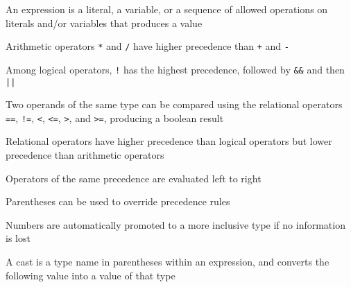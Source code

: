 \documentclass[8pt,a4paper,compress]{beamer}
\begin{document}
\begin{frame}[fragile]
\pause

An expression is a literal, a variable, or a sequence of allowed operations on literals and/or variables that produces a value

\pause
\bigskip

Arithmetic operators \lstinline{*} and \lstinline{/} have higher precedence than \lstinline{+} and \lstinline{-}

\pause
\bigskip

Among logical operators, \lstinline{!} has the highest precedence, followed by \lstinline{&&} and then \lstinline{||}

\pause
\bigskip

Two operands of the same type can be compared using the relational operators \lstinline{==}, \lstinline{!=}, \lstinline{<}, \lstinline{<=}, \lstinline{>}, and \lstinline{>=}, producing a boolean result

\pause
\bigskip

Relational operators have higher precedence than logical operators but lower precedence than arithmetic operators

\pause
\bigskip

Operators of the same precedence are evaluated left to right

\pause
\bigskip

Parentheses can be used to override precedence rules

\pause
\bigskip

Numbers are automatically promoted to a more inclusive type if no information is lost

\pause
\bigskip

A cast is a type name in parentheses within an expression, and converts the following value into a value of that type
\end{frame}
\end{document}
